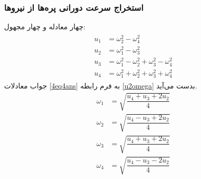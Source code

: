 \subsubsection{استخراج سرعت دورانی پره‌ها از نیروها}
چهار معادله و چهار مجهول:
\begin{align}\label{4eq4ans}
	\begin{split}
		u_1 &= \omega_2^2 - \omega_4^2\\
		u_2 &= \omega_1^2 - \omega_3^2\\
		u_3 &= \omega_1^2 - \omega_2^2  + \omega_3^2 - \omega_4^2\\
		u_4 &= \omega_1^2 + \omega_2^2  + \omega_3^2 + \omega_4^2
	\end{split}
\end{align}
جواب معادلات 
\ref{4eq4ans}
به فرم رابطه 
\ref{u2omega}
بدست می‌آید.
\begin{equation}\label{u2omega}
	\begin{split}
		\omega_1 &= \sqrt{\dfrac{u_4 + u_3 +2u_2}{4}}\\[1em]
		\omega_2 &= \sqrt{\dfrac{u_4 - u_3 +2u_2}{4}}\\[1em]
		\omega_3 &= \sqrt{\dfrac{u_4 + u_3 +2u_2}{4}}\\[1em]
		\omega_4 &= \sqrt{\dfrac{u_4 - u_3 -2u_2}{4}}
	\end{split}
\end{equation}
